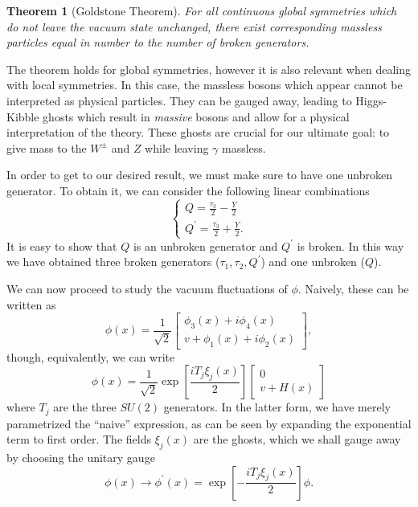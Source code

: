 \documentclass[10pt,a4paper]{book}
\newtheorem*{theorem*}{Theorem}
\begin{document}
\begin{theorem*}[Goldstone Theorem]
\label{Goldstone Theorem}
For all continuous global symmetries which do not leave the vacuum state unchanged, there exist corresponding massless particles equal in number to the number of broken generators.
\end{theorem*}

The theorem holds for global symmetries, however it is also relevant when dealing with local symmetries. In this case, the massless bosons which appear cannot be interpreted as physical particles. They can be gauged away, leading to Higgs-Kibble ghosts which result in \emph{massive} bosons and allow for a physical interpretation of the theory. These ghosts are crucial for our ultimate goal: to give mass to the $W^\pm$ and $Z$ while leaving $\gamma$ massless.

In order to get to our desired result, we must make sure to have one unbroken generator. To obtain it, we can consider the following linear combinations
\begin{equation}
\begin{cases}
Q = \frac{\tau_3}{2} - \frac{Y}{2} \\
Q^\prime = \frac{\tau_3}{2} + \frac{Y}{2}.
\end{cases}
\end{equation}
It is easy to show that $Q$ is an unbroken generator and $Q^\prime$ is broken. In this way we have obtained three broken generators ($\tau_1, \tau_2, Q^\prime$) and one unbroken ($Q$).

We can now proceed to study the vacuum fluctuations of $\phi$. Naively, these can be written as
\begin{equation}
\phi (x) = \frac{1}{\sqrt{2}}\begin{bmatrix}
\phi_3(x) + i\phi_4(x) \\
v + \phi_1(x) + i\phi_2(x)
\end{bmatrix},
\end{equation}
though, equivalently, we can write
\begin{equation}
\phi (x) = \frac{1}{\sqrt{2}}\exp\left[\frac{iT_j\xi_j(x)}{2} \right]\begin{bmatrix}
0 \\
v + H(x)
\end{bmatrix}
\end{equation}
where $T_j$ are the three $SU(2)$ generators. In the latter form, we have merely parametrized the ``naive'' expression, as can be seen by expanding the exponential term to first order. The fields $\xi_j(x)$ are the ghosts, which we shall gauge away by choosing the unitary gauge
\begin{equation}
\phi (x) \rightarrow \phi^\prime (x) = \exp\left[-\frac{iT_j\xi_j(x)}{2} \right]\phi.
\end{equation}  
\end{document}
